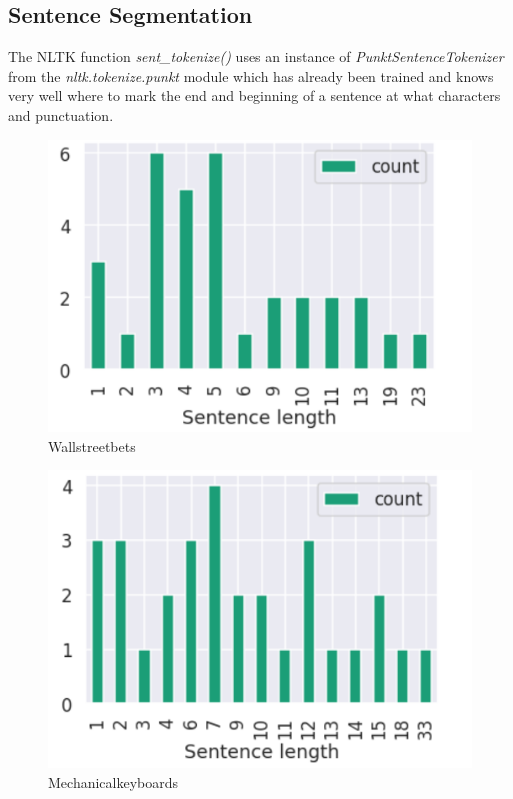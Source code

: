 \documentclass[sigconf,nonacm=true]{acmart}
\begin{document}
\subsection{Sentence Segmentation}
The NLTK function \textit{sent\_tokenize()} uses an instance of \textit{PunktSentenceTokenizer} from the \textit{nltk.tokenize.punkt} module which has already been trained and knows very well where to mark the end and beginning of a sentence at what characters and punctuation. \smallskip

\begin{figure}[H]
	\centering
	\includegraphics[scale = 0.35]{sentence1.png}
	\caption{Wallstreetbets}
\end{figure}
\begin{figure}[H]
	\centering
	\includegraphics[scale=0.35]{sentence2.png}
	\caption{Mechanicalkeyboards}
\end{figure}
\end{document}
